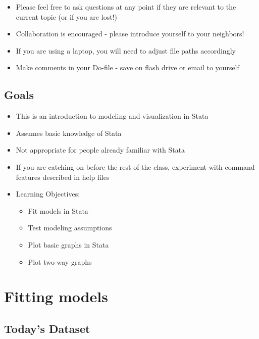 \documentclass[
]{book}
\providecommand{\tightlist}{%
  \setlength{\itemsep}{0pt}\setlength{\parskip}{0pt}}
\begin{document}
\begin{itemize}
\tightlist
\item
  Please feel free to ask questions at any point if they are relevant to the current topic (or if you are lost!)
\item
  Collaboration is encouraged - please introduce yourself to your neighbors!
\item
  If you are using a laptop, you will need to adjust file paths accordingly
\item
  Make comments in your Do-file - save on flash drive or email to yourself
\end{itemize}

\hypertarget{goals-7}{%
\subsection{Goals}\label{goals-7}}

\begin{itemize}
\tightlist
\item
  This is an introduction to modeling and visualization in Stata
\item
  Assumes basic knowledge of Stata
\item
  Not appropriate for people already familiar with Stata
\item
  If you are catching on before the rest of the class, experiment with command features described in help files
\item
  Learning Objectives:

  \begin{itemize}
  \tightlist
  \item
    Fit models in Stata
  \item
    Test modeling assumptions
  \item
    Plot basic graphs in Stata
  \item
    Plot two-way graphs
  \end{itemize}
\end{itemize}

\hypertarget{fitting-models}{%
\section{Fitting models}\label{fitting-models}}

\hypertarget{todays-dataset}{%
\subsection{Today's Dataset}\label{todays-dataset}}
\end{document}
